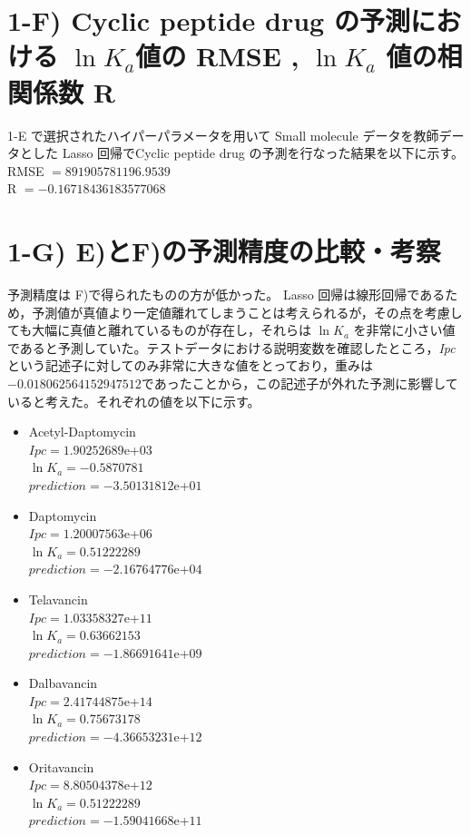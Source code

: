 \documentclass[a4j,11pt]{jarticle}
\begin{document}
\section{1-F)  Cyclic peptide drug の予測における $\ln{K_a}$値の RMSE , $\ln{K_a}$ 値の相関係数 R}
 1-E で選択されたハイパーパラメータを用いて Small molecule データを教師データとした Lasso 回帰でCyclic peptide drug の予測を行なった結果を以下に示す。\\
 \linebreak
RMSE $= 891905781196.9539$\\
R $= -0.16718436183577068$ \\
\section{1-G) E)とF)の予測精度の比較・考察}

予測精度は F)で得られたものの方が低かった。 Lasso 回帰は線形回帰であるため，予測値が真値より一定値離れてしまうことは考えられるが，その点を考慮しても大幅に真値と離れているものが存在し，それらは $\ln{K_a}$ を非常に小さい値であると予測していた。テストデータにおける説明変数を確認したところ，\textit{Ipc}という記述子に対してのみ非常に大きな値をとっており，重みは$-0.018062564152947512$であったことから，この記述子が外れた予測に影響していると考えた。それぞれの値を以下に示す。
\begin{itemize}
\item  Acetyl-Daptomycin\\
 $\textit{Ipc} = 1.90252689$e+$03$\\
 $\ln{K_a} = -0.5870781$\\
 $prediction = -3.50131812$e+$01$\\

\item  Daptomycin\\
 $\textit{Ipc} = 1.20007563$e+$06$\\
  $\ln{K_a} = 0.51222289$\\
 $prediction = -2.16764776$e+$04$\\

\item  Telavancin\\
 $\textit{Ipc} = 1.03358327$e+$11$\\
  $\ln{K_a} = 0.63662153$\\
 $prediction = -1.86691641$e+$09$\\

\item  Dalbavancin\\
 $\textit{Ipc} = 2.41744875$e+$14$\\
  $\ln{K_a} = 0.75673178$\\
 $prediction = -4.36653231$e+$12$\\

\item  Oritavancin\\
 $\textit{Ipc} = 8.80504378$e+$12$\\
  $\ln{K_a} = 0.51222289$\\
 $prediction = -1.59041668$e+$11$\\
 
\end{itemize}
\end{document}

